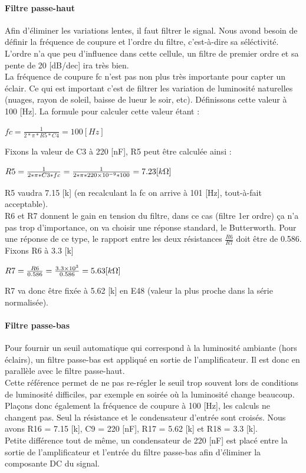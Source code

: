 \documentclass[a4paper,10pt]{article}
\begin{document}
\paragraph{Filtre passe-haut}
Afin d'éliminer les variations lentes, il faut filtrer le signal. Nous avond besoin de définir la fréquence de coupure et l'ordre du filtre, c'est-à-dire sa séléctivité. \\
L'ordre n'a que peu d'influence dans cette cellule, un filtre de premier ordre et sa pente de 20 [dB/dec] ira très bien. \\
La fréquence de coupure fc n'est pas non plus très importante pour capter un éclair. Ce qui est important c'est de filtrer les variation de luminosité naturelles (nuages, rayon de soleil, baisse de lueur le soir, etc). Définissons cette valeur à 100 [Hz]. La formule pour calculer cette valeur étant :
\begin{center}
 $ fc = \frac{1}{2*\pi*R5*C4} = 100 [Hz] $
\end{center}
Fixons la valeur de C3 à 220 [nF], R5 peut être calculée ainsi :
\begin{center}
 $ R5 = \frac{1}{2*\pi*C3*fc} = \frac{1}{2*\pi*\num{220e-9}*100} = 7.23 [k\ohm] $
\end{center}
R5 vaudra 7.15 [k\ohm] (en recalculant la fc on arrive à 101 [Hz], tout-à-fait acceptable). \\
R6 et R7 donnent le gain en tension du filtre, dans ce cas (filtre 1er ordre) ça n'a pas trop d'importance, on va choisir une réponse standard, le Butterworth. Pour une réponse de ce type, le rapport entre les deux résistances $ \frac{R6}{R7} $ doit être de 0.586. Fixons R6 à 3.3 [k\ohm]
\begin{center}
 $ R7 = \frac{R6}{0.586} = \frac{\num{3.3e3}}{0.586} = 5.63 [k\ohm] $
\end{center}
R7 va donc être fixée à 5.62 [k\ohm] en E48 (valeur la plus proche dans la série normalisée).

\paragraph{Filtre passe-bas}
Pour fournir un seuil automatique qui correspond à la luminosité ambiante (hors éclairs), un filtre passe-bas est appliqué en sortie de l'amplificateur. Il est donc en parallèle avec le filtre passe-haut. \\
Cette référence permet de ne pas re-régler le seuil trop souvent lors de conditions de luminosité difficiles, par exemple en soirée où la luminosité change beaucoup. \\
Plaçons donc également la fréquence de coupure à 100 [Hz], les calculs ne changent pas. Seul la résistance et le condensateur d'entrée sont croisés. Nous avons R16 = 7.15 [k\ohm], C9 = 220 [nF], R17 = 5.62 [k\ohm] et R18 = 3.3 [k\ohm].\\
Petite différence tout de même, un condensateur de 220 [nF] est placé entre la sortie de l'amplificateur et l'entrée du filtre passe-bas afin d'éliminer la composante DC du signal.
\end{document}
